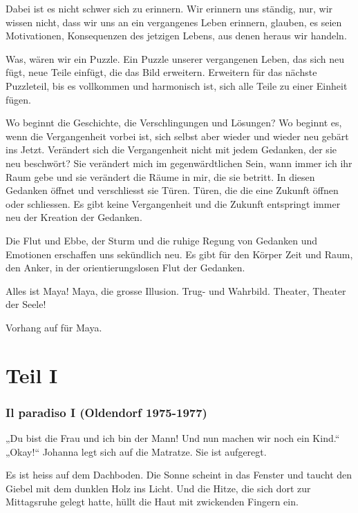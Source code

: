 \documentclass[10pt,titlepage,a5paper]{book}
\begin{document}
Dabei ist es nicht schwer sich zu erinnern. Wir erinnern uns ständig, nur, wir wissen nicht, dass wir uns an ein vergangenes Leben erinnern, glauben, es seien Motivationen, Konsequenzen des jetzigen Lebens, aus denen heraus wir handeln.

Was, wären wir ein Puzzle. Ein Puzzle unserer vergangenen Leben, das sich neu fügt, neue Teile einfügt, die das Bild erweitern. Erweitern für das nächste Puzzleteil, bis es vollkommen und harmonisch ist, sich alle Teile zu einer Einheit fügen.

Wo beginnt die Geschichte, die Verschlingungen und Lösungen? Wo beginnt es, wenn die Vergangenheit vorbei ist, sich selbst aber wieder und wieder neu gebärt ins Jetzt. Verändert sich die Vergangenheit nicht mit jedem Gedanken, der sie neu beschwört? Sie verändert mich im gegenwärdtlichen Sein, wann immer ich ihr Raum gebe und sie verändert die Räume in mir, die sie betritt. In diesen Gedanken öffnet und verschliesst sie Türen. Türen, die die eine Zukunft öffnen oder schliessen. Es gibt keine Vergangenheit und die Zukunft entspringt immer neu der Kreation der Gedanken.

Die Flut und Ebbe, der Sturm und die ruhige Regung von Gedanken und Emotionen erschaffen uns sekündlich neu. Es gibt für den Körper Zeit und Raum, den Anker, in der orientierungslosen Flut der Gedanken. 

Alles ist Maya! Maya, die grosse Illusion. Trug- und Wahrbild. Theater, Theater der Seele!

Vorhang auf für Maya.



\part*{Teil I}


\section*{Il paradiso I (Oldendorf 1975-1977)}



„Du bist die Frau und ich bin der Mann! Und nun machen wir noch ein Kind.“ „Okay!“ Johanna legt sich auf die Matratze. Sie ist aufgeregt.

Es ist heiss auf dem Dachboden. Die Sonne scheint in das Fenster und taucht den Giebel mit dem dunklen Holz ins Licht. Und die Hitze, die sich dort zur Mittagsruhe gelegt hatte, hüllt die Haut mit zwickenden Fingern ein.
\end{document}
